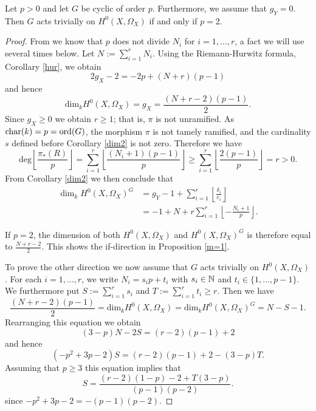     \begin{prop}\label{m=1}
    Let $p  > 0$ and let $G$ be cyclic of order $p$.
    Furthermore, we assume that $g_Y=0$.
    Then $G$ acts trivially on $H^0(X,\Omega_X)$ if and only if $p=2$. 
    \end{prop}
    \begin{proof}
    From \cite[Lem. 1]{Naka} we know that $p$ does not divide $N_i$ for $i=1,\ldots ,r$, a fact we will use several times below. 
    Let $N:= \sum_{i=1}^r N_i$. 
    Using the Riemann-Hurwitz formula, Corollary \ref{hur}, we obtain
        \begin{equation}\label{hur2}
        2g_X - 2 = -2p + (N+r)(p-1)
        \end{equation}
    and hence
        \[
        \textrm{dim}_kH^0(X,\Omega_X) = g_X =\frac{(N+r-2)(p-1)}{2}.
        \] 
    Since $g_X \ge 0$ we obtain $r \ge 1$; that is, $\pi$ is not unramified. 
    As $\operatorname{char}(k) = p = \operatorname{ord}(G)$, the morphism $\pi$ is not tamely ramified, and the cardinality $s$ defined before Corollary \ref{dim2} is not zero.
    Therefore we have 
        \[
        \textrm{deg} \left\lfloor \frac{\pi_*(R)}{p} \right\rfloor =
        \sum_{i=1}^r \left\lfloor \frac{(N_i+1)(p-1)}{p}\right\rfloor 
        \ge \sum_{i=1}^r \left\lfloor \frac{2(p-1)}{p}\right\rfloor = r > 0.
        \] 
    From Corollary \ref{dim2} we then conclude that 
        \begin{align*}
        \dim_kH^0\left(X,\Omega_X\right)^G & =  g_Y - 1 + \sum_{i=1}^r\left\lfloor \frac{\delta_i}{e_i}\right\rfloor \\
        & =  -1 + N + r \sum_{i=1}^r\left\lfloor -\frac{N_i+1}{p}\right\rfloor.
        \end{align*}
    
    If $p=2$, the dimension of both $H^0(X,\Omega_X)$ and $H^0(X,\Omega_X)^G$ is therefore equal to $\frac{N+r-2}{2}$. 
    This shows the if-direction in Proposition \ref{m=1}.
    
    
    
    To prove the other direction we now assume that $G$ acts trivially on $H^0(X, \Omega_X)$.
    For each $i=1, \ldots, r$, we write $N_i = s_i p +t_i$ with $s_i \in {\mathbb N}$ and $t_i \in \{1, \ldots, p-1\}$. 
    We furthermore put $S:=\sum_{i=1}^r s_i$ and $T:= \sum_{i=1}^r t_i \ge r$. 
    Then we have
        \[ 
        \frac{(N+r-2)(p-1)}{2} =\textrm{dim}_kH^0(X,\Omega_X)  = \textrm{dim}_k H^0(X,\Omega_X)^G = N-S-1 .
        \]
    Rearranging this equation we obtain
        \[
        (3-p)N - 2S = (r-2)(p-1) +2  
        \]
    and hence
        \[
        (-p^2 + 3p -2)S = (r-2)(p-1) +2 - (3-p)T.
        \]
    Assuming that $p \ge 3$ this equation implies that
        \[ 
        S = \frac{(r-2)(1-p)-2 + T (3-p)}{(p-1)(p-2)}. 
        \]
    since $-p^2+3p-2 = - (p-1)(p-2)$. 
    

\end{proof}
